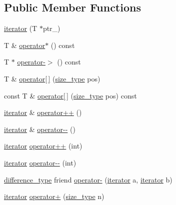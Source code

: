 \subsection*{Public Member Functions}
\begin{DoxyCompactItemize}
\item 
\mbox{\hyperlink{classprevector_1_1iterator_ae9dd2b5e8d96f866e4b05d6b7535f285}{iterator}} (T $\ast$ptr\+\_\+)
\item 
T \& \mbox{\hyperlink{classprevector_1_1iterator_a7f81fb12a0dd106f93629367cdd1be39}{operator$\ast$}} () const
\item 
T $\ast$ \mbox{\hyperlink{classprevector_1_1iterator_a2d71176663fdf1736d59419d8016b652}{operator-\/$>$}} () const
\item 
T \& \mbox{\hyperlink{classprevector_1_1iterator_ad2061d89001f5888618c29cf2f82ceae}{operator\mbox{[}$\,$\mbox{]}}} (\mbox{\hyperlink{classprevector_a7e0da95e6d1c878f6eeb572f4fc12524}{size\+\_\+type}} pos)
\item 
const T \& \mbox{\hyperlink{classprevector_1_1iterator_a2b51fedc4baf3c4bbb82d23d31d13ef3}{operator\mbox{[}$\,$\mbox{]}}} (\mbox{\hyperlink{classprevector_a7e0da95e6d1c878f6eeb572f4fc12524}{size\+\_\+type}} pos) const
\item 
\mbox{\hyperlink{classprevector_1_1iterator}{iterator}} \& \mbox{\hyperlink{classprevector_1_1iterator_a7459dca1c7cead188e6b13700bbfedea}{operator++}} ()
\item 
\mbox{\hyperlink{classprevector_1_1iterator}{iterator}} \& \mbox{\hyperlink{classprevector_1_1iterator_a5ae1b7e4536071159b91cc82f8aacdfc}{operator-\/-\/}} ()
\item 
\mbox{\hyperlink{classprevector_1_1iterator}{iterator}} \mbox{\hyperlink{classprevector_1_1iterator_abb10e5e7efcae2bf8db70acbf0d081cd}{operator++}} (int)
\item 
\mbox{\hyperlink{classprevector_1_1iterator}{iterator}} \mbox{\hyperlink{classprevector_1_1iterator_a55784772609ec1dd13b8b4fa6f11ac82}{operator-\/-\/}} (int)
\item 
\mbox{\hyperlink{classprevector_1_1iterator_a9540618843eb1657d30f7890d04ee6f0}{difference\+\_\+type}} friend \mbox{\hyperlink{classprevector_1_1iterator_a42797a407d87e273e4ff450ac7db068a}{operator-\/}} (\mbox{\hyperlink{classprevector_1_1iterator}{iterator}} a, \mbox{\hyperlink{classprevector_1_1iterator}{iterator}} b)
\item 
\mbox{\hyperlink{classprevector_1_1iterator}{iterator}} \mbox{\hyperlink{classprevector_1_1iterator_ad7b3c04ffe920172bebb072d91f9f899}{operator+}} (\mbox{\hyperlink{classprevector_a7e0da95e6d1c878f6eeb572f4fc12524}{size\+\_\+type}} n)

\end{DoxyCompactItemize}
